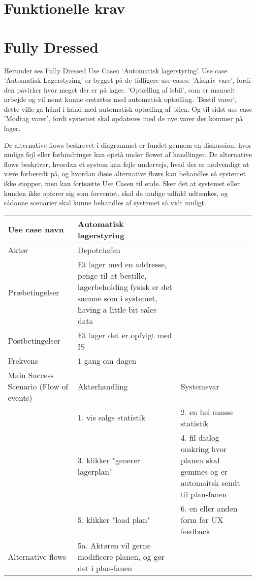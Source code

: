 \section{Funktionelle krav}\label{sec:funktionelle-krav}
\section{Fully Dressed}

Herunder ses Fully Dressed Use Casen ‘Automatisk lagerstyring’. Use case 'Automatisk Lagerstyring' er bygget på de tidligere use cases: 'Afskriv vare', fordi den påvirker hvor meget der er på lager. 'Optælling af isbil', som er manuelt arbejde og vil nemt kunne erstattes med automatisk optælling. 'Bestil varer', dette ville gå hånd i hånd med automatisk optælling af bilen. Og til sidst use case 'Modtag varer', fordi systemet skal opdateres med de nye varer der kommer på lager. 

De alternative flows beskrevet i diagrammet er fundet gennem en diskussion, hvor mulige fejl eller forhindringer kan opstå under flowet af handlinger. De alternative flows beskriver, hvordan et system kan fejle undervejs, hvad der er nødvendigt at være forberedt på, og hvordan disse alternative flows kan behandles så systemet ikke stopper, men kan fortsætte Use Casen til ende. Sker det at systemet eller kunden ikke opfører sig som forventet, skal de mulige udfald udtænkes, og sådanne scenarier skal kunne behandles af systemet så vidt muligt.


\begin{longtable}{ |p{120pt}|p{120pt}|p{120pt}| }
    \hline
    Use case navn & Automatisk lagerstyring & \\
    \hline
    Aktør & Depotchefen & \\
    \hline
    Præbetingelser & Et lager med en addresse, penge til at bestille, lagerbeholding fysisk er det samme som i systemet, having a little bit sales data & \\
    \hline
    Postbetingelser & Et lager det er opfylgt med IS & \\
    \hline
    Frekvens & 1 gang om dagen & \\
    \hline
    Main Success Scenario (Flow of events) & Aktørhandling & Systemsvar \\
    \hline
    & 1. vis salgs statistik & 2. en hel masse statistik \\
    \hline
    & 3. klikker "generer lagerplan" & 4. fil dialog omkring hvor planen skal gemmes og er automaitsk sendt til plan-fanen \\
    \hline
    & 5. klikker "load plan" & 6. en eller anden form for UX feedback \\
    \hline
    Alternative flows & 5a. Aktøren vil gerne modificere planen, og gør det i plan-fanen \\
    \hline
\end{longtable}

